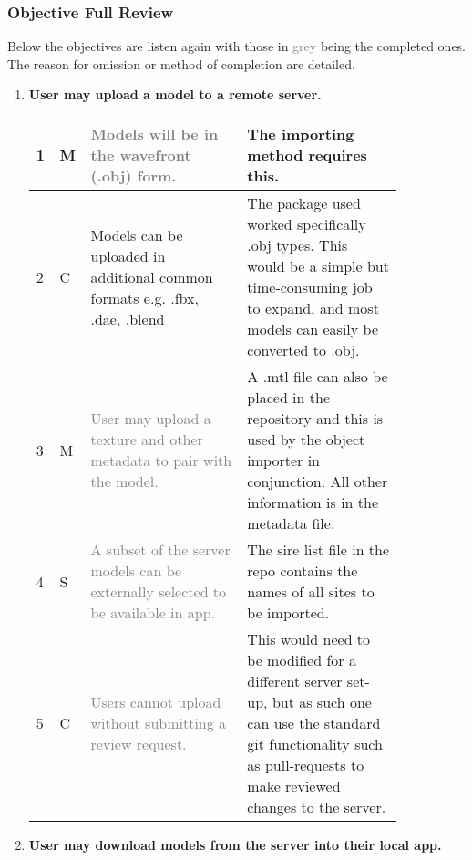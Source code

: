 \documentclass{article}
\newcommand{\light}[1]{\textcolor{gray}{#1}}
\begin{document}
\subsubsection{Objective Full Review}
Below the objectives are listen again with those in \light{grey} being the completed ones. The reason for omission or method of completion are detailed.

\begin{enumerate}[label=\Roman*.]
\item \textbf{User may upload a model to a remote server.}
\begin{table}[H]
\begin{tabular}{| p{0.02\linewidth} | p{0.02\linewidth} | p{0.4\linewidth} | p{0.4\linewidth} | }
\hline
1 & M & \light{Models will be in the wavefront (.obj) form. }            & The importing method requires this. \\ \hline
2 & C & Models can be uploaded in additional common formats e.g. .fbx, .dae, .blend & The package used worked specifically .obj types. This would be a simple but time-consuming job to expand, and most models can easily be converted to .obj. \\ \hline
3 & M & \light{User may upload a texture and other metadata to pair with the model.} & A .mtl file can also be placed in the repository and this is used by the object importer in conjunction. All other information is in the metadata file. \\ \hline
4 & S & \light{A subset of the server models can be externally selected to be available in app.} & The sire list file in the repo contains the names of all sites to be imported. \\ \hline
5 & C & \light{Users cannot upload without submitting a review request.} & This would need to be modified for a different server set-up, but as such one can use the standard git functionality such as pull-requests to make reviewed changes to the server. \\ \hline
\end{tabular}
\end{table}
    
\item \textbf{User may download models from the server into their local app.}


\end{enumerate}
\end{document}
